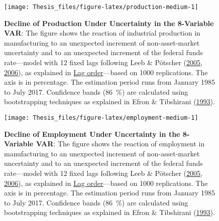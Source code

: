 \documentclass[12pt,twoside]{reedthesis}
\begin{document}
\begin{figure}

{\centering \texttt{[image: Thesis\_files/figure-latex/production-medium-1]} 

}

\caption[Decline of Production Under Uncertainty in the 8-Variable VAR]{\textbf{Decline of Production Under Uncertainty in the 8-Variable VAR}: The figure shows the reaction of industrial production in manufacturing to an unexpected increment of non-asset-market uncertainty and to an unexpected increment of the federal funds rate---model with 12 fixed lags following Leeb \& Pötscher (\protect\hyperlink{ref-leebpots:2005}{2005}, \protect\hyperlink{ref-leebpots:2006}{2006}), as explained in \protect\hyperlink{lag-order}{Lag order}---based on 1000 replications. The axis is in percentage. The estimation period runs from January 1985 to July 2017. Confidence bands (86~\%) are calculated using bootstrapping techniques as explained in Efron \& Tibshirani (\protect\hyperlink{ref-efrotibs:1993}{1993}).}\label{fig:production-medium}
\end{figure}

\begin{figure}

{\centering \texttt{[image: Thesis\_files/figure-latex/employment-medium-1]} 

}

\caption[Decline of Employment Under Uncertainty in the 8-Variable VAR]{\textbf{Decline of Employment Under Uncertainty in the 8-Variable VAR}: The figure shows the reaction of employment in manufacturing to an unexpected increment of non-asset-market uncertainty and to an unexpected increment of the federal funds rate---model with 12 fixed lags following Leeb \& Pötscher (\protect\hyperlink{ref-leebpots:2005}{2005}, \protect\hyperlink{ref-leebpots:2006}{2006}), as explained in \protect\hyperlink{lag-order}{Lag order}---based on 1000 replications. The axis is in percentage. The estimation period runs from January 1985 to July 2017. Confidence bands (86~\%) are calculated using bootstrapping techniques as explained in Efron \& Tibshirani (\protect\hyperlink{ref-efrotibs:1993}{1993}).}\label{fig:employment-medium}
\end{figure}
\end{document}

